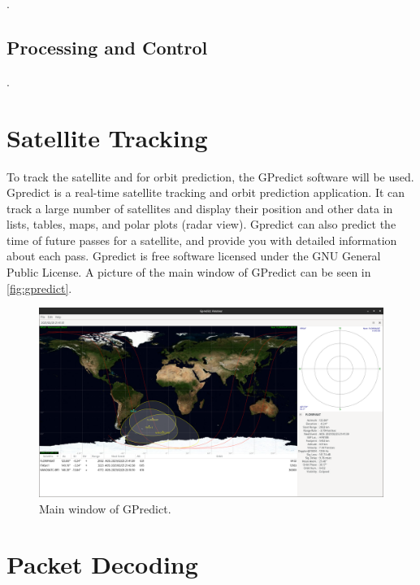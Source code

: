 .

\subsection{Processing and Control}

.

\section{Satellite Tracking}

To track the satellite and for orbit prediction, the GPredict software \cite{gpredict} will be used. Gpredict is a real-time satellite tracking and orbit prediction application. It can track a large number of satellites and display their position and other data in lists, tables, maps, and polar plots (radar view). Gpredict can also predict the time of future passes for a satellite, and provide you with detailed information about each pass. Gpredict is free software licensed under the GNU General Public License. A picture of the main window of GPredict can be seen in \autoref{fig:gpredict}.

\begin{figure}[!ht]
    \begin{center}
        \includegraphics[width=\textwidth]{figures/gpredict.png}
        \caption{Main window of GPredict.}
        \label{fig:gpredict}
    \end{center}
\end{figure}

\section{Packet Decoding}

\cite{spacelab-decoder}

